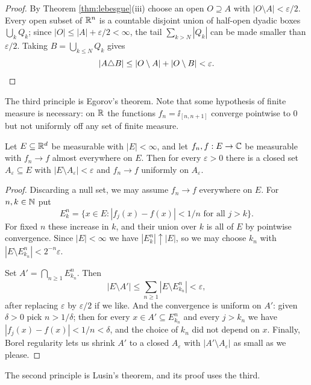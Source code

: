 \documentclass[a4paper]{scrartcl}
\begin{document}
\begin{proof}
	By Theorem \ref{thm:lebesgue}(iii) choose an open $O \supseteq A$ with $|O \setminus A| < \varepsilon/2$. Every open subset of $\mathbb{R}^n$ is a countable disjoint union of half-open dyadic boxes $\bigcup_{k} Q_k$; since $|O| \le |A| + \varepsilon/2 < \infty$, the tail $\sum_{k > N} |Q_k|$ can be made smaller than $\varepsilon/2$. Taking $B = \bigcup_{k \le N} Q_k$ gives
	$$|A \triangle B| \le |O \setminus A| + |O \setminus B| < \varepsilon. \qedhere$$
\end{proof}

The third principle is Egorov's theorem. Note that some hypothesis of finite measure is necessary: on $\mathbb{R}$ the functions $f_n = \ii_{[n, n+1]}$ converge pointwise to $0$ but not uniformly off any set of finite measure.

\begin{theorem}[Egorov]\label{thm:egorov}
	Let $E \subseteq \mathbb{R}^d$ be measurable with $|E| < \infty$, and let $f_n, f : E \to \mathbb{C}$ be measurable with $f_n \to f$ almost everywhere on $E$. Then for every $\varepsilon > 0$ there is a closed set $A_\varepsilon \subseteq E$ with $|E \setminus A_\varepsilon| < \varepsilon$ and $f_n \to f$ uniformly on $A_\varepsilon$.
\end{theorem}

\begin{proof}
	Discarding a null set, we may assume $f_n \to f$ everywhere on $E$. For $n, k \in \mathbb{N}$ put
	$$E^n_k = \{ x \in E : |f_j(x) - f(x)| < 1/n \text{ for all } j > k\}.$$
	For fixed $n$ these increase in $k$, and their union over $k$ is all of $E$ by pointwise convergence. Since $|E| < \infty$ we have $|E^n_k| \uparrow |E|$, so we may choose $k_n$ with $|E \setminus E^n_{k_n}| < 2^{-n} \varepsilon$.

	Set $A' = \bigcap_{n \ge 1} E^n_{k_n}$. Then
	$$|E \setminus A'| \le \sum_{n \ge 1} |E \setminus E^n_{k_n}| < \varepsilon,$$
	after replacing $\varepsilon$ by $\varepsilon/2$ if we like. And the convergence is uniform on $A'$: given $\delta > 0$ pick $n > 1/\delta$; then for every $x \in A' \subseteq E^n_{k_n}$ and every $j > k_n$ we have $|f_j(x) - f(x)| < 1/n < \delta$, and the choice of $k_n$ did not depend on $x$. Finally, Borel regularity lets us shrink $A'$ to a closed $A_\varepsilon$ with $|A' \setminus A_\varepsilon|$ as small as we please.
\end{proof}

The second principle is Lusin's theorem, and its proof uses the third.
\end{document}
